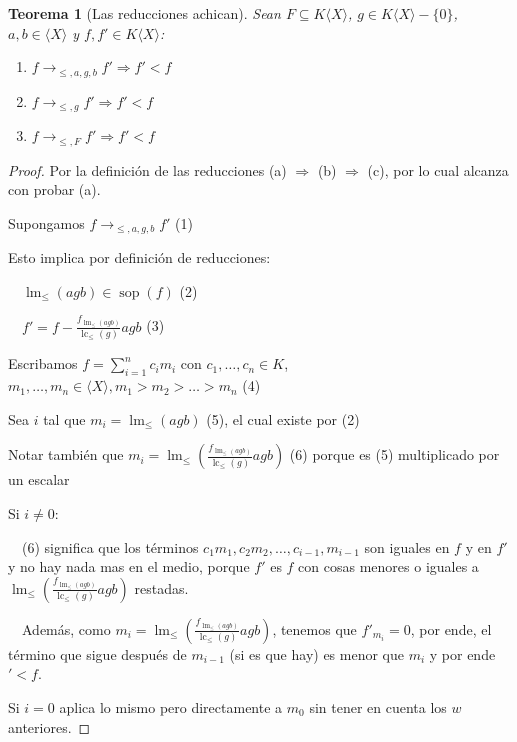\documentclass[fleqn]{amsbook} %
\theoremstyle{customstyle}
\newtheorem{theorem}{Teorema}[section]
\DeclareMathOperator{\sop}{sop}
\DeclareMathOperator{\lm}{lm}
\DeclareMathOperator{\lc}{lc}
\begin{document}
\begin{theorem}[Las reducciones achican]\label{thm:→ achican}
Sean $F ⊆ K⟨X⟩$, $g ∈ K⟨X⟩ - \{0\}$, $a, b ∈ ⟨X⟩$ y $f, f' ∈ K⟨X⟩$:
\begin{enumerate}[label = (\alph*)]
\item $f →_{≤, a, g, b} f' ⇒ f' < f$

\item $f →_{≤, g} f' ⇒ f' < f$

\item $f →_{≤, F} f' ⇒ f' < f$
\end{enumerate}
\end{theorem}
\begin{proof}
Por la definición de las reducciones (a) $⇒$ (b) $⇒$ (c), por lo cual alcanza con probar (a).

Supongamos $f →_{≤, a, g, b} f'$ (1)

Esto implica por definición de reducciones:

  $\lm_≤(agb) ∈ \sop(f)$ (2)

  $f' = f - \frac{f_{\lm_≤(agb)}}{\lc_≤(g)}agb$ (3)

Escribamos $f = ∑_{i = 1}^n c_i m_i$ con $c_1, …, c_n ∈ K$, $m_1, …, m_n ∈ ⟨X⟩, m_1 > m_2 > … > m_n$ (4)

Sea $i$ tal que $m_i = \lm_≤(agb)$ (5), el cual existe por (2)

Notar también que $m_i = \lm_≤(\frac{f_{\lm_≤(agb)}}{\lc_≤(g)}agb)$ (6) porque es (5) multiplicado por un escalar

Si $i ≠ 0$:

  (6) significa que los términos $c_1 m_1, c_2 m_2, …, c_{i-1}, m_{i-1}$ son iguales en $f$ y en $f'$ y no hay nada mas en el medio, porque $f'$ es $f$ con cosas menores o iguales a $\lm_≤(\frac{f_{\lm_≤(agb)}}{\lc_≤(g)}agb)$ restadas.

  Además, como $m_i = \lm_≤(\frac{f_{\lm_≤(agb)}}{\lc_≤(g)}agb)$, tenemos que $f'_{m_i} = 0$, por ende, el término que sigue después de $m_{i-1}$ (si es que hay) es menor que $m_i$ y por ende $' < f$.

Si $i = 0$ aplica lo mismo pero directamente a $m_0$ sin tener en cuenta los $w$ anteriores.

\end{proof}

\end{document}
